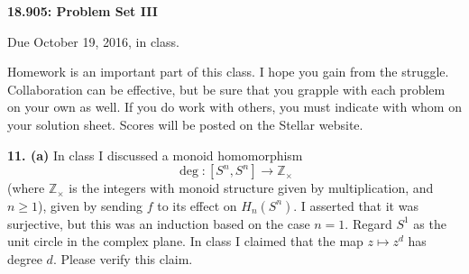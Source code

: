 \documentclass[12pt]{article}
\begin{document}
\thispagestyle{empty}

\def\da#1{\downarrow\rlap{$\vcenter{\hbox{$\scriptstyle#1$}}$}}
\def\ua#1{\uparrow\rlap{$\vcenter{\hbox{$\scriptstyle#1$}}$}}

\def\coker{\mathrm{coker}\,}
\def\im{\mathrm{im}\,}
\def\ker{\mathrm{ker}\,}
\def\NN{\mathbb N}
\def\ZZ{\mathbb Z}
\def\RR{\mathbf R}
\def\Ext{\mathrm{Ext}}
\def\Tor{\mathrm{Tor}}
\def\Hom{\mathrm{Hom}}
\def\Der{\mathrm{Der}}
\def\Map{\mathrm{Map}}
\def\Gp{\mathbf{Gp}}
\def\Mon{\mathbf{Mon}}
\def\mod{\hbox{mod}}
\def\be{\begin{equation}}
\def\ee{\end{equation}}
\def\tensor{\otimes}
\def\iso{\cong}
\def\Ho{\mathrm{Ho}\,}
\def\rin{\mathrm{in}}
\def\la#1{\mathop{\longleftarrow}\limits^{#1}}
\def\ra#1{\mathop{\longrightarrow}\limits^{#1}}
\def\bS{\mathbf{S}}

\def\inj{\mathrm{in}}
\def\pr{\mathrm{pr}}
\def\div{\mathrm{div}}
\def\grad{\mathrm{grad}}
\def\curl{\mathrm{curl}}
\def\Sin{\mathrm{Sin}}

\def\SF{\mathcal{C}^\infty}
\def\VF{\mathcal{VF}^\infty}


\def\TT{\mathbb{T}}
\def\Tensor{\bigotimes}
\def\bDelta{\mathbf{\Delta}}
\def\bSet{\mathbf{Set}}
\def\bAb{\mathbf{Ab}}
\def\bTop{\mathbf{Top}}
\def\bC{\mathbf{C}}
\def\ob{\mathrm{ob}}
\def\bVS{\mathbf{VS}}



\begin{center}
{\bf 18.905: Problem Set III}
\end{center}

Due October 19, 2016, in class. 

Homework is an important part of this class. I hope you gain from the
struggle. Collaboration can be effective, but be sure that you
grapple with each problem on your own as well. If you do work with others,
you must indicate with whom on your solution sheet. Scores will be posted
on the Stellar website.

\bigskip
{\bf 11. (a)} In class I discussed a monoid homomorphism
\[
\deg:[S^n,S^n]\to\ZZ_\times
\]
(where $\ZZ_\times$ is the integers with monoid structure given by 
multiplication, and $n\geq1$),
given by sending $f$ to its effect on $H_n(S^n)$. 
I asserted that it was surjective, but this was an induction based on
the case $n=1$. Regard $S^1$ as the unit circle in the complex plane. 
In class I claimed that the map $z\mapsto z^d$ has degree $d$.
Please verify this claim. 
\end{document}
